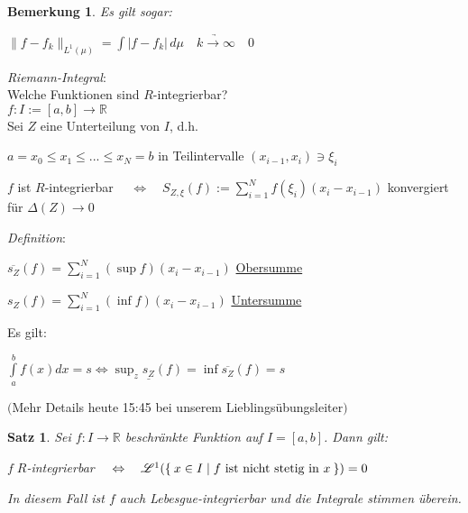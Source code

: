 \documentclass[11pt]{memoir}
\theoremstyle{changebreak}
\newtheorem{Bemerkung}{Bemerkung}[chapter]
\newtheorem{Satz}{Satz}[chapter]
\begin{document}
\begin{Bemerkung}
Es gilt sogar: 
\begin{center}
	$\|f - f_k\|_{L^1(\mu)} = \int |f - f_k| \,d\mu \quad \underrightarrow{k \rightarrow \infty} \quad 0$
\end{center}
\end{Bemerkung}

\par\bigskip
\emph{Riemann-Integral}: \\

Welche Funktionen sind $R$-integrierbar? \\
$f: I:=[a, b] \rightarrow \mathbb R$ \\
Sei $Z$ eine Unterteilung von $I$, d.h. 
\begin{center}
	$a=x_0\leq x_1 \leq ... \leq x_N = b$ in Teilintervalle $(x_{i-1}, x_i) \ni \xi_i$ 
\end{center}
\begin{center}
	$f$ ist $R$-integrierbar $\quad \Leftrightarrow \quad S_{Z, \xi} (f) := \sum\limits_{i=1}^N f(\xi_i)(x_i - x_{i-1})$ konvergiert für $\Delta(Z) \rightarrow 0$ 
\end{center}


\emph{Definition}: \\
\begin{center}
	$\overline{s_Z}(f) = \sum\limits_{i=1}^N (\sup f)(x_i  - x_{i-1})$ \quad \underline{Obersumme} 
\end{center}
\begin{center}
	\underline{$s_Z$}$(f) = \sum\limits_{i=1}^N (\inf f)(x_i - x_{i-1})$ \quad \underline{Untersumme} 
\end{center}
Es gilt:
\begin{center}
	$\int\limits_a^b f(x) dx = s \Leftrightarrow \sup_z \underline{s_Z}(f) = \inf \overline{s_Z}(f) = s$ 
\end{center}
$($Mehr Details heute 15:45 bei unserem Lieblingsübungsleiter$)$

\begin{Satz}
Sei $f: I \rightarrow \mathbb R$ beschränkte Funktion auf $I = [a, b]$. Dann gilt: 
\begin{center}
	$f \;R$-integrierbar $\quad \Leftrightarrow\quad  \mathscr L^1(\Set{x \in I | f \text{ ist nicht stetig in } x }) = 0$ 
\end{center}
In diesem Fall ist $f$ auch Lebesgue-integrierbar und die Integrale stimmen überein.
\end{Satz}
\end{document}
